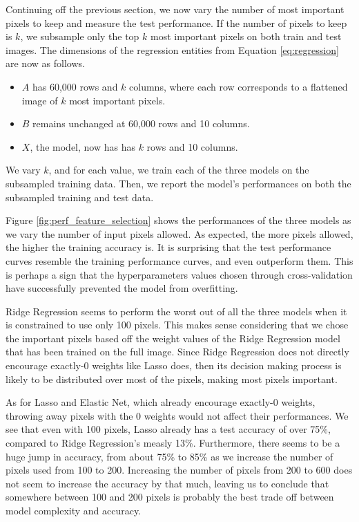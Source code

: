 \documentclass[letterpaper, 10 pt, conference]{ieeeconf}  %
\begin{document}
Continuing off the previous section, we now vary the number of most important pixels to keep and measure the test performance. If the number of pixels to keep is $k$, we subsample only the top $k$ most important pixels on both train and test images. The dimensions of the regression entities from Equation \ref{eq:regression} are now as follows.
\begin{itemize}
    \item $A$ has 60,000 rows and $k$ columns, where each row corresponds to a flattened image of $k$ most important pixels.
    \item $B$ remains unchanged at 60,000 rows and 10 columns.
    \item $X$, the model, now has has $k$ rows and 10 columns.
\end{itemize}

We vary $k$, and for each value, we train each of the three models on the subsampled training data. Then, we report the model's performances on both the subsampled training and test data.

Figure \ref{fig:perf_feature_selection} shows the performances of the three models as we vary the number of input pixels allowed. As expected, the more pixels allowed, the higher the training accuracy is. It is surprising that the test performance curves resemble the training performance curves, and even outperform them. This is perhaps a sign that the hyperparameters values chosen through cross-validation have successfully prevented the model from overfitting.

Ridge Regression seems to perform the worst out of all the three models when it is constrained to use only 100 pixels. This makes sense considering that we chose the important pixels based off the weight values of the Ridge Regression model that has been trained on the full image. Since Ridge Regression does not directly encourage exactly-0 weights like Lasso does, then its decision making process is likely to be distributed over most of the pixels, making most pixels important.

As for Lasso and Elastic Net, which already encourage exactly-0 weights, throwing away pixels with the 0 weights would not affect their performances. We see that even with 100 pixels, Lasso already has a test accuracy of over 75\%, compared to Ridge Regression's measly 13\%. Furthermore, there seems to be a huge jump in accuracy, from about 75\% to 85\% as we increase the number of pixels used from 100 to 200. Increasing the number of pixels from 200 to 600 does not seem to increase the accuracy by that much, leaving us to conclude that somewhere between 100 and 200 pixels is probably the best trade off between model complexity and accuracy. 
\end{document}
